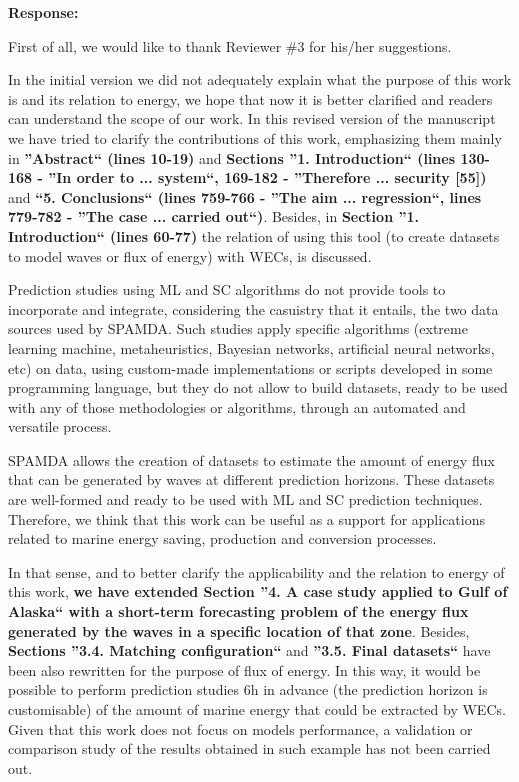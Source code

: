 \documentclass[a4paper,twoside,11pt]{article}
\begin{document}
\textbf{Response:}
{
First of all, we would like to thank Reviewer \#3 for his/her suggestions.

In the initial version we did not adequately explain what the purpose of this work is and its relation to energy, we hope that now it is better clarified and readers can understand the scope of our work. In this revised version of the manuscript we have tried to clarify the contributions of this work, emphasizing them mainly in \textbf{''Abstract`` (lines 10-19)} and \textbf{Sections ''1. Introduction`` (lines 130-168 - ''In order to ... system``, 169-182 - ''Therefore ... security [55])} and \textbf{``5. Conclusions`` (lines 759-766 - ''The aim ... regression``, lines 779-782 - ''The case ... carried out``)}. Besides, in \textbf{Section ''1. Introduction`` (lines 60-77)} the relation of using this tool (to create datasets to model waves or flux of energy) with WECs, is discussed.

Prediction studies using ML and SC algorithms do not provide tools to incorporate and integrate, considering the casuistry that it entails, the two data sources used by SPAMDA. Such studies apply specific algorithms (extreme learning machine, metaheuristics, Bayesian networks, artificial neural networks, etc) on data, using custom-made implementations or scripts developed in some programming language, but they do not allow to build datasets, ready to be used with any of those methodologies or algorithms, through an automated and versatile process.

SPAMDA allows the creation of datasets to estimate the amount of energy flux that can be generated by waves at different prediction horizons. These datasets are well-formed and ready to be used with ML and SC prediction techniques. Therefore, we think that this work can be useful as a support for applications related to marine energy saving, production and conversion processes.

In that sense, and to better clarify the applicability and the relation to energy of this work, \textbf{we have extended Section ''4. A case study applied to Gulf of Alaska`` with a short-term forecasting problem of the energy flux generated by the waves in a specific location of that zone}. Besides, \textbf{Sections ''3.4. Matching configuration``} and \textbf{''3.5. Final datasets``} have been also rewritten for the purpose of flux of energy. In this way, it would be possible to perform prediction studies 6h in advance (the prediction horizon is customisable) of the amount of marine energy that could be extracted by WECs. Given that this work does not focus on models performance, a validation or comparison study of the results obtained in such example has not been carried out. 

}
\end{document}
